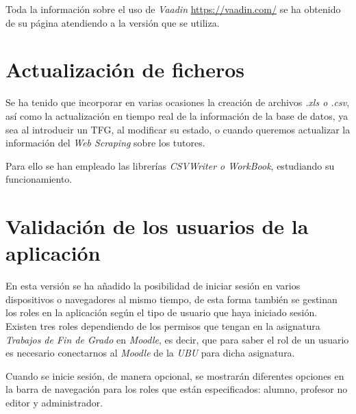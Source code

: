 Toda la información sobre el uso de \emph{Vaadin} \url{https://vaadin.com/} se ha obtenido de su página atendiendo a la versión que se utiliza.

\section{Actualización de ficheros}

Se ha tenido que incorporar en varias ocasiones la creación de archivos \emph{.xls o .csv}, así como la actualización en tiempo real de la información de la base de datos, ya sea al introducir un TFG, al modificar su estado, o cuando queremos actualizar la información del \emph{Web Scraping} sobre los tutores.

Para ello se han empleado las librerías \emph{CSVWriter o WorkBook}, estudiando su funcionamiento.

\section{Validación de los usuarios de la aplicación}

En esta versión se ha añadido la posibilidad de iniciar sesión en varios dispositivos o navegadores al mismo tiempo, de esta forma también se gestinan los roles en la aplicación según el tipo de usuario que haya iniciado sesión. Existen tres roles dependiendo de los permisos que tengan en la asignatura \emph{Trabajos de Fin de Grado} en \emph{Moodle}, es decir, que para saber el rol de un usuario es necesario conectarnos al \emph{Moodle} de la \emph{UBU} para dicha asignatura.

Cuando se inicie sesión, de manera opcional, se mostrarán diferentes opciones en la barra de navegación para los roles que están especificados: alumno, profesor no editor y administrador.